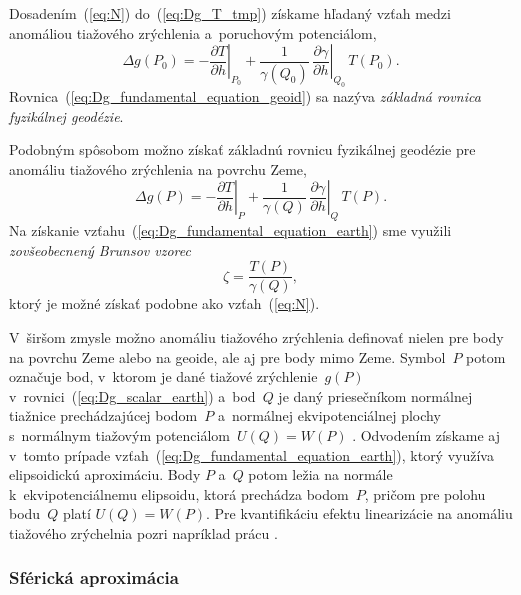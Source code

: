 \documentclass[a4paper,12pt]{book}
\begin{document}
Dosadením~(\ref{eq:N}) do~(\ref{eq:Dg_T_tmp}) získame hľadaný vzťah medzi 
anomáliou tiažového zrýchlenia a~poruchovým potenciálom,
%
\begin{equation}
\label{eq:Dg_fundamental_equation_geoid}
\Delta g(P_0) = -\left.\frac{\partial T}{\partial h}\right|_{P_0} 
+ \frac{1}{\gamma(Q_0)} \, \left.\frac{\partial \gamma}{\partial 
h}\right|_{Q_0} \, T(P_0){.}
\end{equation}
%
Rovnica~(\ref{eq:Dg_fundamental_equation_geoid}) sa nazýva \emph{základná 
rovnica fyzikálnej geodézie}.

Podobným spôsobom možno získať základnú rovnicu fyzikálnej geodézie pre 
anomáliu tiažového zrýchlenia na povrchu Zeme,
%
\begin{equation}
\label{eq:Dg_fundamental_equation_earth}
\Delta g(P) = -\left.\frac{\partial T}{\partial h}\right|_{P} 
+ \frac{1}{\gamma(Q)} \, \left.\frac{\partial \gamma}{\partial h}\right|_{Q} \, 
T(P){.}
\end{equation}
%
Na získanie vzťahu~(\ref{eq:Dg_fundamental_equation_earth}) sme využili 
\emph{zovšeobecnený Brunsov vzorec}
%
\begin{equation}
\label{eq:zeta}
\zeta = \frac{T(P)}{\gamma(Q)}{,}
\end{equation}
%
ktorý je možné získať podobne ako vzťah~(\ref{eq:N}).

V~širšom zmysle možno anomáliu tiažového zrýchlenia definovať nielen pre body 
na povrchu Zeme alebo na geoide, ale aj pre body mimo Zeme.  Symbol~$P$ potom 
označuje bod, v~ktorom je dané tiažové zrýchlenie~$g(P)$ 
v~rovnici~(\ref{eq:Dg_scalar_earth}) a~bod~$Q$ je daný priesečníkom normálnej 
tiažnice prechádzajúcej bodom~$P$ a~normálnej ekvipotenciálnej plochy 
s~normálnym tiažovým potenciálom~$U(Q) = W(P)$ 
\parencite{MoritzPhysicalGeodesy}.  Odvodením získame aj v~tomto prípade 
vzťah~(\ref{eq:Dg_fundamental_equation_earth}), ktorý využíva elipsoidickú 
aproximáciu.  Body $P$ a~$Q$ potom ležia na normále k~ekvipotenciálnemu 
elipsoidu, ktorá prechádza bodom~$P$, pričom pre polohu bodu~$Q$ platí $U(Q) 
= W(P)$.  Pre kvantifikáciu efektu linearizácie na anomáliu tiažového 
zrýchelnia pozri napríklad prácu \textcite{Claessens2006}.

\subsubsection{Sférická aproximácia}
\end{document}
